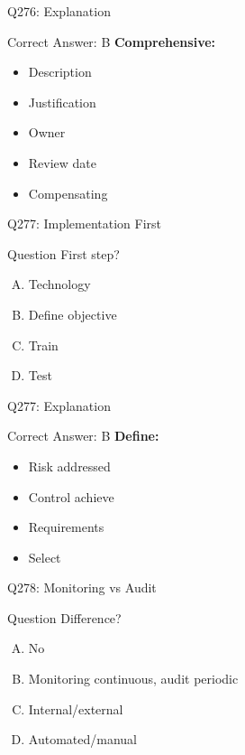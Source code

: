 \documentclass{beamer}
\begin{document}
	\begin{frame}{Q276: Explanation}
		\begin{block}{Correct Answer: B}
			\textbf{Comprehensive:}
			\begin{itemize}
				\item Description
				\item Justification
				\item Owner
				\item Review date
				\item Compensating
			\end{itemize}
		\end{block}
	\end{frame}
	
	\begin{frame}{Q277: Implementation First}
		\begin{block}{Question}
			First step?
		\end{block}
		\begin{enumerate}[(A)]
			\item Technology
			\item Define objective
			\item Train
			\item Test
		\end{enumerate}
	\end{frame}
	
	\begin{frame}{Q277: Explanation}
		\begin{block}{Correct Answer: B}
			\textbf{Define:}
			\begin{itemize}
				\item Risk addressed
				\item Control achieve
				\item Requirements
				\item Select
			\end{itemize}
		\end{block}
	\end{frame}
	
	\begin{frame}{Q278: Monitoring vs Audit}
		\begin{block}{Question}
			Difference?
		\end{block}
		\begin{enumerate}[(A)]
			\item No
			\item Monitoring continuous, audit periodic
			\item Internal/external
			\item Automated/manual
		\end{enumerate}
	\end{frame}
	
\end{document}
